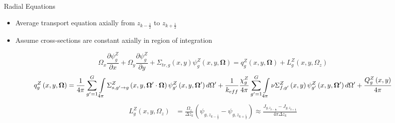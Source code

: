 
\begin{frame}[t]{Radial Equations}
    
    \begin{itemize}
      \item Average transport equation axially from $z_{k-\frac{1}{2}}$ to 
      $z_{k+\frac{1}{2}}$
      \item Assume cross-sections are constant axially in region of integration
    \end{itemize}
    \begin{dmath*}
        {\Omega_x\frac{\partial \psi_{g}^Z}{\partial x} + 
        \Omega_y\frac{\partial \psi_{g}^Z}{\partial y}} + 
        {\Sigma_{tr,g}\left(x,y\right)\psi_{g}^Z\left(x,y,\bm\Omega\right)} = 
        {q_{g}^Z\left(x,y,\bm \Omega\right)} + 
        {L_{g}^Z\left(x,y,\Omega_z\right)}
    \end{dmath*}
    \begin{dmath*}
        {q_{g}^Z\left(x,y,\bm \Omega\right)} = 
        {\frac{1}{4\pi}\sum_{g'=1}^{G}\intop_{4\pi}\Sigma_{s,g'\rightarrow 
        g}^Z\left(x,y,\bm\Omega'\cdot\bm\Omega\right)\psi_{g'}^Z\left(x,y,\bm\Omega'\right)d\Omega'}
         + {\frac{1}{k_{eff}}\frac{\chi_{g}^Z}{4\pi}\sum_{g'=1}^G\intop_{4\pi} 
        \nu\Sigma_{f,g'}^Z\left(x,y\right)\psi_{g'}^Z\left(x,y,\bm\Omega'\right)d\Omega'}
         + {\frac{Q_{g}^Z\left(x,y\right)}{4\pi}}
    \end{dmath*}
    \begin{align*}
    L_{g}^Z\left(x,y,\Omega_z\right) &= \frac{\Omega_z}{\Delta z_k}\left(\psi_{g,z_{k-\frac{1}{2}}} - \psi_{g,z_{k+\frac{1}{2}}}\right) \approx \frac{J_{g,z_{k-\frac{1}{2}}} - J_{g,z_{k+\frac{1}{2}}}}{4\pi\Delta z_k}
    \end{align*}
    
\end{frame}



